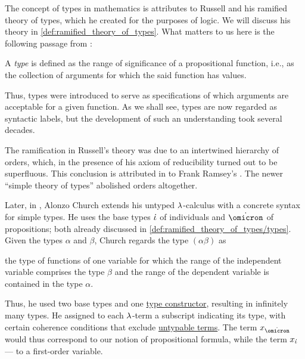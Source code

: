 \begin{remark}\label{rem:type_theory}
  The concept of types in mathematics is attributes to Russell and his ramified theory of types, which he created for the purposes of logic. We will discuss his theory in \cref{def:ramified_theory_of_types}. What matters to us here is the following passage from :
  \begin{displayquote}
    A \textit{type} is defined as the range of significance of a propositional function, i.e., as the collection of arguments for which the said function has values.
  \end{displayquote}

  Thus, types were introduced to serve as specifications of which arguments are acceptable for a given function. As we shall see, types are now regarded as syntactic labels, but the development of such an understanding took several decades.

  The ramification in Russell's theory was due to an intertwined hierarchy of orders, which, in the presence of his axiom of reducibility turned out to be superfluous. This conclusion is attributed in \cite[45]{Kleene1971Metamathematics} to Frank Ramsey's \cite{Ramsey1926Foundations}. The newer \enquote{simple theory of types} abolished orders altogether.

  Later, in \cite{Church1940STT}, Alonzo Church extends his untyped \( {\mathrm \lambda} \)-calculus with a concrete syntax for simple types. He uses the base types \( \dot{\iota} \) of individuals and \( \syn\omicron \) of propositions; both already discussed in \cref{def:ramified_theory_of_types/types}. Given the types \( \alpha \) and \( \beta \), Church regards the type \( (\alpha\beta) \) as
  \begin{displayquote}
    \textellipsis the type of functions of one variable for which the range of the independent variable comprises the type \( \beta \) and the range of the dependent variable is contained in the type \( \alpha \).
  \end{displayquote}

  Thus, he used two base types and one \hyperref[con:type_constructor]{type constructor}, resulting in infinitely many types. He assigned to each \( {\mathrm \lambda} \)-term a subscript indicating its type, with certain coherence conditions that exclude \hyperref[def:typability]{untypable terms}. The term \( x_{\syn\omicron} \) would thus correspond to our notion of propositional formula, while the term \( x_{\dot{\iota}} \) --- to a first-order variable.


\end{remark}
